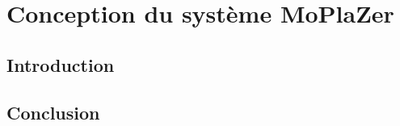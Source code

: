 \chapter{\textbf{Conception du système MoPlaZer}}
    \section{Introduction}
    \section{Conclusion}